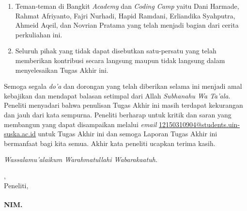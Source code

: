 \begin{enumerate}
	\item Teman-teman di Bangkit \textit{Academy} dan \textit{Coding Camp} yaitu Dani Harmade, Rahmat Afriyanto, Fajri Nurhadi, Hapid Ramdani, Erliandika Syahputra, Ahmeid Aqeil, dan Novrian Pratama yang telah menjadi bagian dari cerita perkuliahan ini.
	\item Seluruh pihak yang tidak dapat disebutkan satu-persatu yang telah memberikan kontribusi secara langsung maupun tidak langsung dalam menyelesaikan Tugas Akhir ini.
\end{enumerate}

Semoga segala \textit{do'a} dan dorongan yang telah diberikan selama ini menjadi amal kebajikan dan mendapat balasan setimpal dari Allah \textit{Subhanahu Wa Ta’ala}. Peneliti menyadari bahwa penulisan Tugas Akhir ini masih terdapat kekurangan dan jauh dari kata sempurna. Peneliti berharap untuk kritik dan saran yang membangun yang dapat disampaikan melalui \textit{email} \href{mailto:12150310904@students.uin-suska.ac.id}{12150310904@students.uin-suska.ac.id} untuk Tugas Akhir ini dan semoga Laporan Tugas Akhir ini bermanfaat bagi kita semua. Akhir kata peneliti ucapkan terima kasih.

\textit{Wassalamu’alaikum Warahmatullahi Wabarakaatuh.}

\vspace*{0.1cm}



\begin{flushright}
	\kota, \tanggalPersetujuan\\
	Peneliti,\\
	\vspace{2cm}
	\textbf{\underline{\penulis}\\
		\vspace{-0.15cm}
		NIM. \nim}

\end{flushright}
